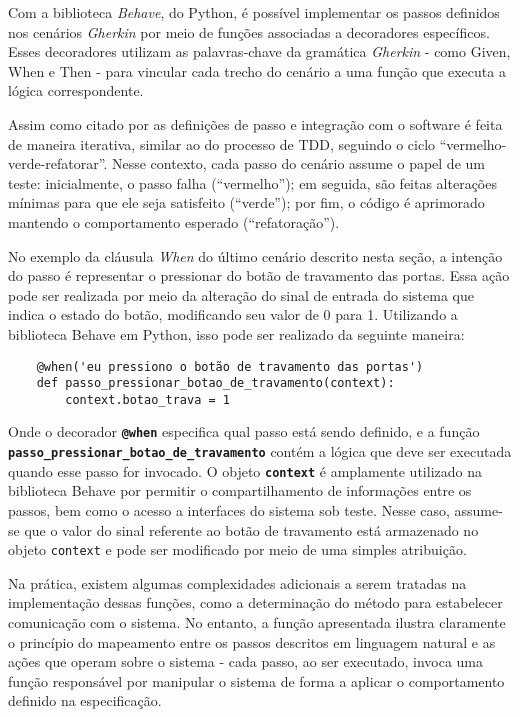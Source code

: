 Com a biblioteca \textit{Behave}, do Python, é possível implementar os passos definidos nos cenários \textit{Gherkin} por meio de funções associadas a decoradores específicos. 
Esses decoradores utilizam as palavras-chave da gramática \textit{Gherkin} - como Given, When e Then - para vincular cada trecho do cenário a uma função que executa a 
lógica correspondente.

Assim como citado por  as definições de passo e integração com o software é feita de maneira iterativa, similar ao do processo de TDD, seguindo o ciclo 
“vermelho-verde-refatorar”. Nesse contexto, cada passo do cenário assume o papel de um teste: inicialmente, o passo falha (“vermelho”); em seguida, são feitas alterações 
mínimas para que ele seja satisfeito (“verde”); por fim, o código é aprimorado mantendo o comportamento esperado (“refatoração”).

No exemplo da cláusula \textit{When} do último cenário descrito nesta seção, a intenção do passo é representar o pressionar do botão de travamento das portas. Essa ação pode 
ser realizada por meio da alteração do sinal de entrada do sistema que indica o estado do botão, modificando seu valor de 0 para 1. Utilizando a biblioteca Behave em 
Python, isso pode ser realizado da seguinte maneira:

\begin{verbatim}
	@when('eu pressiono o botão de travamento das portas')
	def passo_pressionar_botao_de_travamento(context):
		context.botao_trava = 1
\end{verbatim}

Onde o decorador \texttt{\textbf{@when}} especifica qual passo está sendo definido, e a função \texttt{\textbf{passo\_pressionar\_botao\_de\_travamento}} contém a lógica que
deve ser executada quando esse passo for invocado. O objeto \texttt{\textbf{context}} é amplamente utilizado na biblioteca Behave por permitir o compartilhamento de 
informações entre os passos, bem como o 
acesso a interfaces do sistema sob teste. Nesse caso, assume-se que o valor do sinal referente ao botão de travamento está armazenado no objeto \texttt{context} e pode ser 
modificado por meio de uma simples atribuição.

Na prática, existem algumas complexidades adicionais a serem tratadas na implementação dessas funções, como a determinação do método para estabelecer comunicação 
com o sistema. No entanto, a função apresentada ilustra claramente o princípio do mapeamento entre os passos descritos 
em linguagem natural e as ações que operam sobre o sistema - cada passo, ao ser executado, invoca uma função responsável por manipular o sistema de forma a aplicar o 
comportamento definido na especificação.

